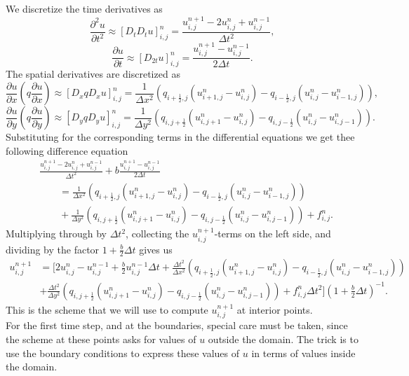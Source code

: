 \documentclass[paper=a4, fontsize=11pt]{article} %
\newcommand{\p}{\partial}
\begin{document}
We discretize the time derivatives as
\[
\frac{\p^2 u}{\p t^2}\approx[D_tD_tu]^n_{i,j}
	=\frac{u^{n+1}_{i,j}-2u^{n}_{i,j}+u^{n-1}_{i,j}}{\Delta t^2},
\]
\[
\frac{\p u}{\p t}\approx[D_{2t}u]^n_{i,j}=\frac{u^{n+1}_{i,j}-u^{n-1}_{i,j}}{2\Delta t}.
\]
The spatial derivatives are discretized as
\[
\frac{\p u}{\p x}\left(q\frac{\p u}{\p x}\right)\approx[D_xqD_xu]^n_{i,j}
	=\frac{1}{\Delta x^2}\left(q_{i+\frac{1}{2},j}(u^{n}_{i+1,j}-u^{n}_{i,j})-
	q_{i-\frac{1}{2},j}(u^{n}_{i,j}-u^{n}_{i-1,j})\right),
\]
\[
\frac{\p u}{\p y}\left(q\frac{\p u}{\p y}\right)\approx[D_yqD_yu]^n_{i,j}
	=\frac{1}{\Delta y^2}\left(q_{i,j+\frac{1}{2}}(u^{n}_{i,j+1}-u^{n}_{i,j})-
	q_{i,j-\frac{1}{2}}(u^{n}_{i,j}-u^{n}_{i,j-1})\right).
\]
Substituting for the corresponding terms in the differential equations we get thee following difference equation
\begin{align*}
&\frac{u^{n+1}_{i,j}-2u^{n}_{i,j}+u^{n-1}_{i,j}}{\Delta t^2}
	+b\frac{u^{n+1}_{i,j}-u^{n-1}_{i,j}}{2\Delta t} \\ 
&\quad\quad =\frac{1}{\Delta x^2}\left(q_{i+\frac{1}{2},j}(u^{n}_{i+1,j}-u^{n}_{i,j})
	-q_{i-\frac{1}{2},j}(u^{n}_{i,j}-u^{n}_{i-1,j})\right) \\
&\quad\quad +\frac{1}{\Delta y^2}\left(q_{i,j+\frac{1}{2}}(u^{n}_{i,j+1}-u^{n}_{i,j})
	-q_{i,j-\frac{1}{2}}(u^{n}_{i,j}-u^{n}_{i,j-1})\right) + f^n_{i,j}.
\end{align*}
Multiplying through by $\Delta t^2$, collecting the $u^{n+1}_{i,j}$-terms on the left side, and dividing by the factor $1+\frac{b}{2}\Delta t$ gives us
\begin{align*}
u^{n+1}_{i,j}&=\bigg[2u^{n}_{i,j}-u^{n-1}_{i,j}+\frac{b}{2}u^{n-1}_{i,j}\Delta t+\frac{\Delta t^2}{\Delta x^2}\left(q_{i+\frac{1}{2},j}(u^{n}_{i+1,j}-u^{n}_{i,j})
	-q_{i-\frac{1}{2},j}(u^{n}_{i,j}-u^{n}_{i-1,j})\right) \\
&+\frac{\Delta t^2}{\Delta y^2}\left(q_{i,j+\frac{1}{2}}(u^{n}_{i,j+1}-u^{n}_{i,j})
	-q_{i,j-\frac{1}{2}}(u^{n}_{i,j}-u^{n}_{i,j-1})\right) + f^n_{i,j}\Delta t^2\bigg](1+\frac{b}{2}\Delta t)^{-1}.
\end{align*}
This is the scheme that we will use to compute $u^{n+1}_{i,j}$ at interior points. \\

For the first time step, and at the boundaries, special care must be taken, since the scheme at these points asks for values of $u$ outside the domain. The trick is to use the boundary conditions to express these values of $u$ in terms of values inside the domain.\\
\end{document}
